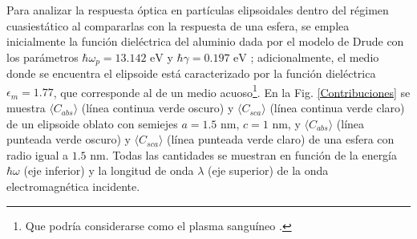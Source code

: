 Para analizar la respuesta óptica en partículas elipsoidales dentro del régimen cuasiestático al compararlas con la respuesta de una esfera, se emplea inicialmente la función dieléctrica del aluminio dada por el modelo de Drude con los parámetros $\hbar\omega_p=13.142\text{ eV}$ y $\hbar\gamma=0.197\text{ eV}$ \cite{Aluminio}; adicionalmente, el medio donde se encuentra el elipsoide está caracterizado por la función dieléctrica $\epsilon_m = 1.77$, que corresponde al de un medio acuoso\footnote{Que podría considerarse como el plasma sanguíneo \cite{Blood}.}. En la Fig. \ref{Contribuciones} se muestra $\langle C_{abs} \rangle$ (línea continua verde oscuro) y $\langle C_{sca} \rangle$ (línea continua verde claro) de  un elipsoide oblato con semiejes $a=1.5\text{ nm}$, $c=1\text{ nm}$, y $\langle C_{abs} \rangle$ (línea punteada verde oscuro) y $\langle C_{sca} \rangle$ (línea punteada verde claro) de una esfera con radio igual a $1.5\text{ nm}$. Todas las cantidades se muestran
en función de la energía $\hbar\omega$ (eje inferior) y la longitud de onda $\lambda$ (eje superior) de la onda electromagnética incidente. \\
